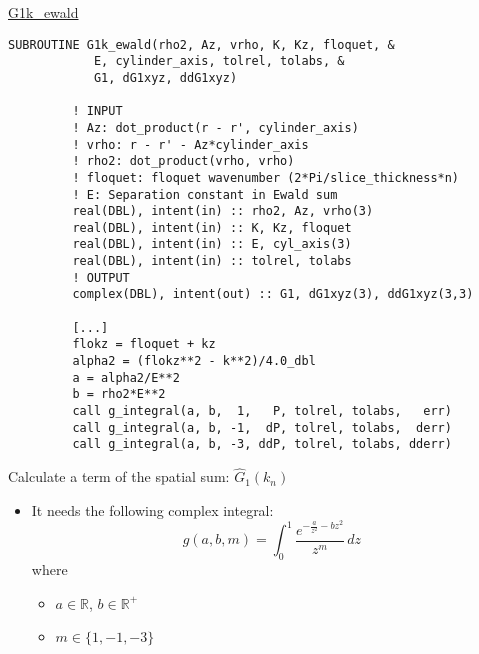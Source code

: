 \begin{frame}{\url{G1k_ewald}}
  
  \begin{lstlisting}[style=myFORTRANcodeS]
      SUBROUTINE G1k_ewald(rho2, Az, vrho, K, Kz, floquet, &
            E, cylinder_axis, tolrel, tolabs, &
            G1, dG1xyz, ddG1xyz)

         ! INPUT
         ! Az: dot_product(r - r', cylinder_axis)
         ! vrho: r - r' - Az*cylinder_axis
         ! rho2: dot_product(vrho, vrho) 
         ! floquet: floquet wavenumber (2*Pi/slice_thickness*n)
         ! E: Separation constant in Ewald sum
         real(DBL), intent(in) :: rho2, Az, vrho(3)
         real(DBL), intent(in) :: K, Kz, floquet
         real(DBL), intent(in) :: E, cyl_axis(3)
         real(DBL), intent(in) :: tolrel, tolabs
         ! OUTPUT
         complex(DBL), intent(out) :: G1, dG1xyz(3), ddG1xyz(3,3)

         [...]
         flokz = floquet + kz
         alpha2 = (flokz**2 - k**2)/4.0_dbl
         a = alpha2/E**2
         b = rho2*E**2
         call g_integral(a, b,  1,   P, tolrel, tolabs,   err)
         call g_integral(a, b, -1,  dP, tolrel, tolabs,  derr)
         call g_integral(a, b, -3, ddP, tolrel, tolabs, dderr)
  \end{lstlisting}

  Calculate a term of the spatial sum: $\hat{G}_1(k_n)$

  \begin{itemize}\small
    \item It needs the following complex integral: 
      \[
        g(a,b,m) = \int_0^1 \frac{
          e^{-\frac{a}{z^2}-b z^2}
        }{z^m}
        \, dz
      \]
      where
      \begin{itemize}
        \item $a\in \mathbb{R}$, $b\in \mathbb{R^+}$
        \item $m \in \{1,-1,-3\}$
      \end{itemize}
  \end{itemize}


\end{frame}
